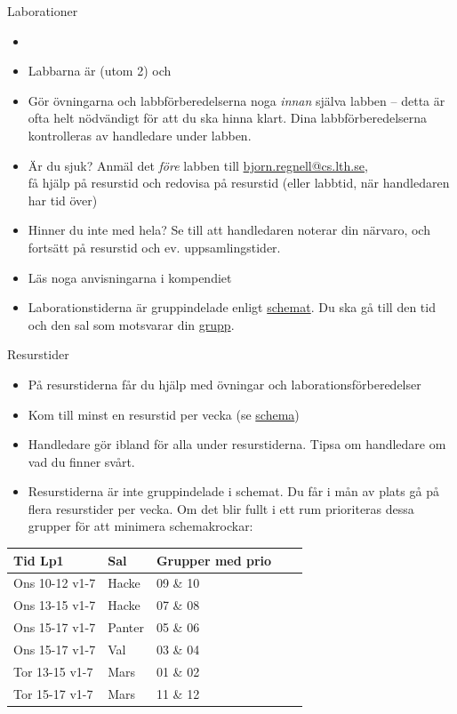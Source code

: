 \ifkompendium\else  %
\begin{Slide}{Laborationer}\footnotesize
\begin{itemize}
\item {}
\item Labbarna är  (utom 2) och 
\item Gör övningarna och labbförberedelserna noga \textit{innan} själva labben -- detta är ofta helt nödvändigt för att du ska hinna klart. Dina labbförberedelserna kontrolleras av handledare under labben.
\item Är du sjuk? Anmäl det \textit{före} labben till \url{bjorn.regnell@cs.lth.se}, \\ få hjälp på resurstid och redovisa på resurstid (eller labbtid, när handledaren har tid över)
\item Hinner du inte med hela? Se till att handledaren noterar din närvaro, och fortsätt på resurstid och ev. uppsamlingstider.
\item Läs noga anvisningarna i kompendiet
\item Laborationstiderna är gruppindelade enligt \href{http://cs.lth.se/eda016/schema/}{schemat}. Du ska gå till den tid och den sal som motsvarar din \href{http://cs.lth.se/eda016/grupper/}{grupp}.
\end{itemize}
\end{Slide}

\begin{Slide}{Resurstider}
\begin{itemize}
\item På resurstiderna får du hjälp med övningar och laborationsförberedelser
\item Kom till minst en resurstid per vecka (se \href{http://cs.lth.se/eda016/schema/}{schema})
\item Handledare gör ibland  för alla under resurstiderna. Tipsa om handledare om vad du finner svårt.
\item Resurstiderna är inte gruppindelade i schemat. Du får i mån av plats gå på flera resurstider per vecka. Om det blir fullt i ett rum prioriteras dessa grupper för att minimera schemakrockar: 
\end{itemize}
\begin{table}[]
\centering\scriptsize
\begin{tabular}{lllll}
Tid Lp1 & Sal & Grupper med prio \\
\hline
Ons 10-12 v1-7 & Hacke  &   09 \& 10 \\
Ons 13-15 v1-7 & Hacke  &   07 \& 08  \\
Ons 15-17 v1-7 & Panter  & 05 \& 06   \\
Ons 15-17 v1-7 & Val       &  03 \& 04   \\
Tor 13-15 v1-7 & Mars     & 01 \& 02  \\
Tor 15-17 v1-7 & Mars     & 11 \& 12 \\ 
\end{tabular}
\end{table}
\end{Slide}

\fi